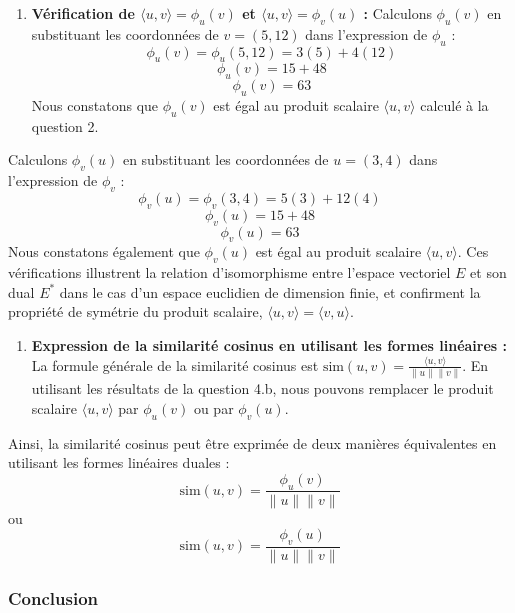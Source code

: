\documentclass[11pt,a4paper]{report}
\begin{document}
\begin{enumerate}
  \begin{enumerate}
  \def\labelenumii{\alph{enumii}.}
  \setcounter{enumii}{1}

  \item
    \textbf{Vérification de \(\langle u, v \rangle = \phi_u(v)\) et
    \(\langle u, v \rangle = \phi_v(u)\) :} Calculons \(\phi_u(v)\) en
    substituant les coordonnées de \(v = (5, 12)\) dans l'expression de
    \(\phi_u\) : \[ \phi_u(v) = \phi_u(5, 12) = 3(5) + 4(12) \]
    \[ \phi_u(v) = 15 + 48 \] \[ \phi_u(v) = 63 \] Nous constatons que
    \(\phi_u(v)\) est égal au produit scalaire \(\langle u, v \rangle\)
    calculé à la question 2.
  \end{enumerate}

  Calculons \(\phi_v(u)\) en substituant les coordonnées de
  \(u = (3, 4)\) dans l'expression de \(\phi_v\) :
  \[ \phi_v(u) = \phi_v(3, 4) = 5(3) + 12(4) \]
  \[ \phi_v(u) = 15 + 48 \] \[ \phi_v(u) = 63 \] Nous constatons
  également que \(\phi_v(u)\) est égal au produit scalaire
  \(\langle u, v \rangle\). Ces vérifications illustrent la relation
  d'isomorphisme entre l'espace vectoriel \(E\) et son dual \(E^*\) dans
  le cas d'un espace euclidien de dimension finie, et confirment la
  propriété de symétrie du produit scalaire,
  \(\langle u, v \rangle = \langle v, u \rangle\).

  \begin{enumerate}
  \def\labelenumii{\alph{enumii}.}
  \setcounter{enumii}{2}

  \item
    \textbf{Expression de la similarité cosinus en utilisant les formes
    linéaires :} La formule générale de la similarité cosinus est
    \(\text{sim}(u, v) = \frac{\langle u, v \rangle}{\|u\| \|v\|}\). En
    utilisant les résultats de la question 4.b, nous pouvons remplacer
    le produit scalaire \(\langle u, v \rangle\) par \(\phi_u(v)\) ou
    par \(\phi_v(u)\).
  \end{enumerate}

  Ainsi, la similarité cosinus peut être exprimée de deux manières
  équivalentes en utilisant les formes linéaires duales :
  \[ \text{sim}(u, v) = \frac{\phi_u(v)}{\|u\| \|v\|} \] ou
  \[ \text{sim}(u, v) = \frac{\phi_v(u)}{\|u\| \|v\|} \]
\end{enumerate}

\hypertarget{conclusion}{%
\subsubsection{Conclusion}\label{conclusion}}
\end{document}
